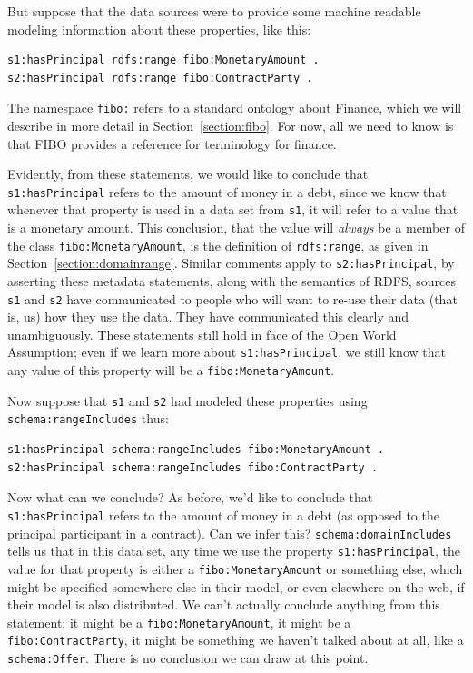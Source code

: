 But suppose that the data sources were to provide some machine readable modeling information about these properties, 
like this:

\begin{lstlisting}
s1:hasPrincipal rdfs:range fibo:MonetaryAmount .
s2:hasPrincipal rdfs:range fibo:ContractParty .
\end{lstlisting}

The namespace \texttt{fibo:} refers to a standard ontology about Finance, which we will describe in more detail
in Section~\ref{section:fibo}. For now, all we need to know is that FIBO provides a reference for terminology
for finance.   

Evidently, from these statements, we would like to conclude that \texttt{s1:hasPrincipal} refers to the amount of money 
in a debt, since we know that whenever that property is used in a data set from \texttt{s1}, it will refer to a value that 
is a monetary amount.  This conclusion, that the value will \emph{always} be a member of the class \texttt{fibo:MonetaryAmount}, 
is the definition of \texttt{rdfs:range}, as given in Section~\ref{section:domainrange}.  Similar comments apply
to \texttt{s2:hasPrincipal}, by asserting these metadata statements, along with the semantics of RDFS, sources \texttt{s1}
and \texttt{s2} have communicated to people who will want to re-use their data (that is, us) how they use the 
data.  They have communicated this clearly and unambiguously.  These statements still hold in face of the Open World Assumption;
even if we learn more about \texttt{s1:hasPrincipal}, we still know that any value of this property will be a \texttt{fibo:MonetaryAmount}. 

Now suppose that \texttt{s1} and \texttt{s2} had modeled these properties using  \texttt{schema:rangeIncludes} thus:

\begin{lstlisting}
s1:hasPrincipal schema:rangeIncludes fibo:MonetaryAmount .
s2:hasPrincipal schema:rangeIncludes fibo:ContractParty .
\end{lstlisting}

Now what can we conclude?  As before, we'd like to conclude that \texttt{s1:hasPrincipal} refers to the amount of money 
in a debt (as opposed to the principal participant in a contract).  Can we infer this?  \texttt{schema:domainIncludes} tells 
us that in this data set, any time we use the property \texttt{s1:hasPrincipal}, the value for that property is either
a \texttt{fibo:MonetaryAmount} or something else, which might be specified somewhere else in their model, 
or even elsewhere on the web, if their model is also distributed.  We can't actually
conclude anything from this statement; it might be a \texttt{fibo:MonetaryAmount}, it might be a \texttt{fibo:ContractParty}, it 
might be something we haven't talked about at all, like a \texttt{schema:Offer}.  There is no conclusion we can draw at this
point. 


